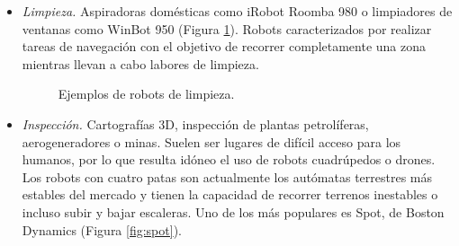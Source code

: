 \begin{itemize}
 \item \textit{Limpieza.} Aspiradoras domésticas como iRobot Roomba 980 o limpiadores de ventanas como WinBot 950 (Figura \ref{fig:robots_limpieza}). Robots caracterizados por realizar tareas de navegación con el objetivo de recorrer completamente una zona mientras llevan a cabo labores de limpieza.\\

\begin{figure}[h!]
  \begin{center}
    \subcapcentertrue
    \hspace{2mm}
  \end{center}
\caption{Ejemplos de robots de limpieza.}
\label{fig:robots_limpieza}
\end{figure}

\item \textit{Inspección.} Cartografías 3D, inspección de plantas petrolíferas, aerogeneradores o minas. Suelen ser lugares de difícil acceso para los humanos, por lo que resulta idóneo el uso de robots cuadrúpedos o drones. Los robots con cuatro patas son actualmente los autómatas terrestres más estables del mercado y tienen la capacidad de recorrer terrenos inestables o incluso subir y bajar escaleras. Uno de los más populares es Spot, de Boston Dynamics (Figura \ref{fig:spot}).\\


\end{itemize}
